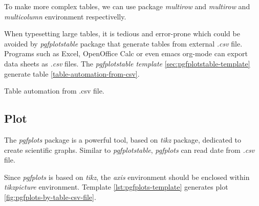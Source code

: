 To make more complex tables, we can use package \textit{multirow}
and \textit{multirow} and \textit{multicolumn} environment
respectivelly.

When typesetting large tables, it is tedious and error-prone which
could be avoided by \textit{pgfplotstable} package that generate
tables from external \textit{.csv} file. Programs such as Excel,
OpenOffice Calc or even emacs org-mode can export data sheets as
\textit{.csv} files. The \textit{pgfplotstable template}
\ref{sec:pgfplotstable-template} generate table
\ref{table-automation-from-csv}.

\begin{table}[tbp]
  \centering{}
  \caption{Table automation from .csv file.}
  \label{table-automation-from-csv}
\end{table}

\subsection{Plot}
\label{sec:plot}

The \textit{pgfplots} package is a powerful tool, based on
\textit{tikz} package, dedicated to create scientific
graphs. Similar to \textit{pgfplotstable}, \textit{pgfplots} can
read date from \textit{.csv} file.

Since \textit{pgfplots} is based on \textit{tikz}, the
\textit{axis} environment should be enclosed within
\textit{tikzpicture} environment. Template
\ref{lst:pgfplots-template} generates plot
\ref{fig:pgfplots-by-table-csv-file}.

